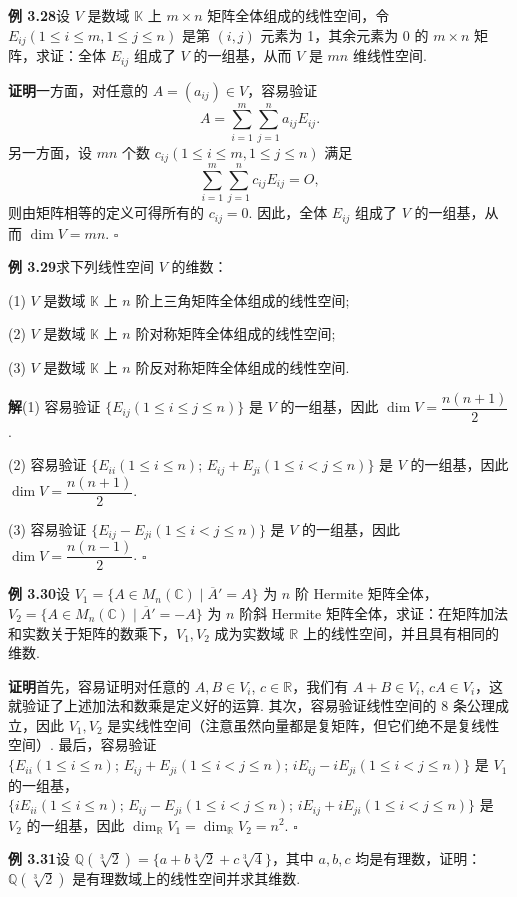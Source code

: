 \documentclass[UTF8, 12pt, fontset=fandol, oneside]{ctexart}
\begin{document}
\noindent\textbf{例 3.28}\quad 设 $V$ 是数域 $\mathbb{K}$ 上 $m\times n$ 矩阵全体组成的线性空间，令 $E_{ij}(1\le i\le m,1\le j\le n)$ 是第 $(i,j)$ 元素为 1，其余元素为 0 的 $m\times n$ 矩阵，求证：全体 $E_{ij}$ 组成了 $V$ 的一组基，从而 $V$ 是 $mn$ 维线性空间.

\noindent\textbf{证明}\quad 一方面，对任意的 $A=(a_{ij})\in V$，容易验证
\[
A=\sum_{i=1}^m\sum_{j=1}^n a_{ij}E_{ij}.
\]
另一方面，设 $mn$ 个数 $c_{ij}(1\le i\le m,1\le j\le n)$ 满足
\[
\sum_{i=1}^m\sum_{j=1}^n c_{ij}E_{ij}=O,
\]
则由矩阵相等的定义可得所有的 $c_{ij}=0$. 因此，全体 $E_{ij}$ 组成了 $V$ 的一组基，从而 $\dim V=mn$. $\square$

\noindent\textbf{例 3.29}\quad 求下列线性空间 $V$ 的维数：

(1) $V$ 是数域 $\mathbb{K}$ 上 $n$ 阶上三角矩阵全体组成的线性空间;

(2) $V$ 是数域 $\mathbb{K}$ 上 $n$ 阶对称矩阵全体组成的线性空间;

(3) $V$ 是数域 $\mathbb{K}$ 上 $n$ 阶反对称矩阵全体组成的线性空间.

\noindent\textbf{解}\quad (1) 容易验证 $\{E_{ij}(1\le i\le j\le n)\}$ 是 $V$ 的一组基，因此 $\dim V=\dfrac{n(n+1)}{2}$.

(2) 容易验证 $\{E_{ii}(1\le i\le n);\,E_{ij}+E_{ji}(1\le i<j\le n)\}$ 是 $V$ 的一组基，因此 $\dim V=\dfrac{n(n+1)}{2}$.

(3) 容易验证 $\{E_{ij}-E_{ji}(1\le i<j\le n)\}$ 是 $V$ 的一组基，因此 $\dim V=\dfrac{n(n-1)}{2}$. $\square$

\noindent\textbf{例 3.30}\quad 设 $V_1=\{A\in M_n(\mathbb{C})\mid \overline{A}'=A\}$ 为 $n$ 阶 Hermite 矩阵全体，$V_2=\{A\in M_n(\mathbb{C})\mid \overline{A}'=-A\}$ 为 $n$ 阶斜 Hermite 矩阵全体，求证：在矩阵加法和实数关于矩阵的数乘下，$V_1,V_2$ 成为实数域 $\mathbb{R}$ 上的线性空间，并且具有相同的维数.

\noindent\textbf{证明}\quad 首先，容易证明对任意的 $A,B\in V_i$, $c\in\mathbb{R}$，我们有 $A+B\in V_i$, $cA\in V_i$，这就验证了上述加法和数乘是定义好的运算. 其次，容易验证线性空间的 8 条公理成立，因此 $V_1,V_2$ 是实线性空间（注意虽然向量都是复矩阵，但它们绝不是复线性空间）. 最后，容易验证 $\{E_{ii}(1\le i\le n);\,E_{ij}+E_{ji}(1\le i<j\le n);\,iE_{ij}-iE_{ji}(1\le i<j\le n)\}$ 是 $V_1$ 的一组基，$\{iE_{ii}(1\le i\le n);\,E_{ij}-E_{ji}(1\le i<j\le n);\,iE_{ij}+iE_{ji}(1\le i<j\le n)\}$ 是 $V_2$ 的一组基，因此 $\dim_{\mathbb{R}}V_1=\dim_{\mathbb{R}}V_2=n^2$. $\square$

\noindent\textbf{例 3.31}\quad 设 $\mathbb{Q}(\sqrt[3]{2})=\{a+b\sqrt[3]{2}+c\sqrt[3]{4}\}$，其中 $a,b,c$ 均是有理数，证明：$\mathbb{Q}(\sqrt[3]{2})$ 是有理数域上的线性空间并求其维数.
\end{document}
